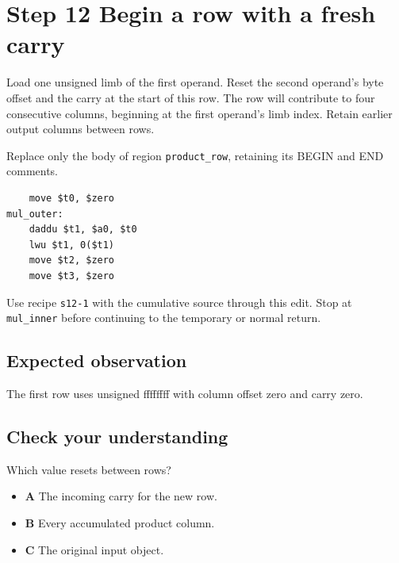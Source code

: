 \section{Step 12 Begin a row with a fresh carry}\label{rsa-s12}

Load one unsigned limb of the first operand. Reset the second operand's byte offset and the carry at the start of this row. The row will contribute to four consecutive columns, beginning at the first operand's limb index. Retain earlier output columns between rows.

Replace only the body of region \texttt{product\_row}, retaining its BEGIN and END comments.

\begin{verbatim}
    move $t0, $zero
mul_outer:
    daddu $t1, $a0, $t0
    lwu $t1, 0($t1)
    move $t2, $zero
    move $t3, $zero
\end{verbatim}

Use recipe \texttt{s12-1} with the cumulative source through this edit. Stop at \texttt{mul\_inner} before continuing to the temporary or normal return.

\subsection{Expected observation}
The first row uses unsigned ffffffff with column offset zero and carry zero.

\subsection{Check your understanding}
Which value resets between rows?

\begin{itemize}
  \item \textbf{A} The incoming carry for the new row.
  \item \textbf{B} Every accumulated product column.
  \item \textbf{C} The original input object.
\end{itemize}
